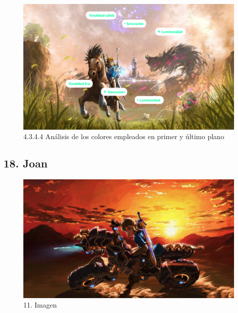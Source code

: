 \documentclass[12pt]{article}
\begin{document}
    \begin{figure}[H]
      \centering
      \includegraphics[scale=0.7]{images/Saúl/Sección 17/EA_img17_4Color_4AnalisisPlanosPrimeroFondo.png}
      \caption{\small 4.3.4.4 Análisis de los colores empleados en primer y último plano}
    \end{figure}


        \newpage


    \subsection{18. Joan}
        \begin{figure}[H]
          \centering
          \includegraphics[scale=0.20]{images/Concepts/18_concept_art.jpg}
          \caption{\small 11. Imagen}
        \end{figure}
\end{document}
